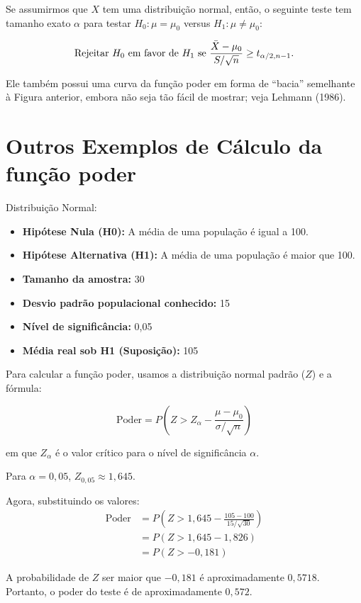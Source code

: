 \documentclass[12pt]{beamer}
\begin{document}
\begin{frame}{}
\begin{block}{}
\justifying
Se assumirmos que $X$ tem uma distribuição normal, então, o seguinte teste tem tamanho exato $\alpha$ para testar $H_0 : \mu = \mu_0$ versus $H_1 : \mu \neq \mu_0$:

\begin{align}
\text{Rejeitar } H_0 \text{ em favor de } H_1 \text{ se } \frac{\Bar{X} - \mu_0}{S/\sqrt{n}} \geq t_{\alpha/2, n-1}. 
\end{align}

Ele também possui uma curva da função poder em forma de ``bacia'' semelhante à Figura anterior, embora não seja tão fácil de mostrar; veja Lehmann (1986).
\end{block}
\end{frame}

\section{Outros Exemplos de Cálculo da função poder}
\begin{frame}{}
\begin{block}{Distribuição Normal:}
\justifying

\begin{itemize}
\item \textbf{Hipótese Nula (H0):} A média de uma população é igual a 100.
\item \textbf{Hipótese Alternativa (H1):} A média de uma população é maior que 100.
\item \textbf{Tamanho da amostra:} 30
\item \textbf{Desvio padrão populacional conhecido:} 15
\item \textbf{Nível de significância:} 0,05
\item \textbf{Média real sob H1 (Suposição):} 105
\end{itemize}

Para calcular a função poder, usamos a distribuição normal padrão ($Z$) e a fórmula:

\[ \text{Poder} = P(Z > Z_{\alpha} - \frac{\mu - \mu_0}{\sigma/\sqrt{n}}) \]

em que $Z_{\alpha}$ é o valor crítico para o nível de significância $\alpha$.
\end{block}
\end{frame}

\begin{frame}{}
\begin{block}{}
\justifying
Para $\alpha = 0,05$, $Z_{0,05} \approx 1,645.$

Agora, substituindo os valores:
\begin{align*}
    \text{Poder} &= P(Z > 1,645 - \frac{105 - 100}{15/\sqrt{30}})\\
    &= P(Z > 1,645 - 1,826)\\
    &= P(Z > -0,181)
\end{align*}

A probabilidade de $Z$ ser maior que $-0,181$ é aproximadamente $0,5718$. Portanto, o poder do teste é de aproximadamente $0,572$.
\end{block}
\end{frame}
\end{document}
